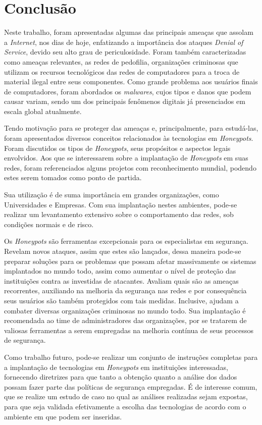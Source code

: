 \chapter*{Conclusão}

Neste trabalho, foram apresentadas algumas das principais ameaças que assolam a \textit{Internet}, nos dias de hoje, enfatizando a importância dos ataques \textit{Denial of Service}, devido seu alto grau de periculosidade. Foram também caracterizadas como ameaças relevantes, as redes de pedofilia, organizações criminosas que utilizam os recursos tecnológicos das redes de computadores para a troca de material ilegal entre seus componentes. Como grande problema aos usuários finais de computadores, foram abordados os \textit{malwares}, cujos tipos e danos que podem causar variam, sendo um dos principais fenômenos digitais já presenciados em escala global atualmente.

Tendo motivação para se proteger das ameaças e, principalmente, para estudá-las, foram apresentados diversos conceitos relacionados às tecnologias em \textit{Honeypots}. Foram discutidos os tipos de \textit{Honeypots}, seus propósitos e aspectos legais envolvidos. Aos que se interessarem sobre a implantação de \textit{Honeypots} em suas redes, foram referenciados alguns projetos com reconhecimento mundial, podendo estes serem tomados como ponto de partida.

Sua utilização é de suma importância em grandes organizações, como Universidades e Empresas. Com sua implantação nestes ambientes, pode-se realizar um levantamento extensivo sobre o comportamento das redes, sob condições normais e de risco.

Os \textit{Honeypots} são ferramentas excepcionais para os especialistas em segurança. Revelam novos ataques, assim que estes são lançados, dessa maneira pode-se preparar soluções para os problemas que possam afetar massivamente os sistemas implantados no mundo todo, assim como aumentar o nível de proteção das instituições contra as investidas de atacantes. Avaliam quais são as ameaças recorrentes, auxiliando na melhoria da segurança nas redes e por consequência seus usuários são também protegidos com tais medidas. Inclusive, ajudam a combater diversas organizações criminosas no mundo todo. Sua implantação é recomendada ao time de administradores das organizações, por se tratarem de valiosas ferramentas a serem empregadas na melhoria contínua de seus processos de segurança.

Como trabalho futuro, pode-se realizar um conjunto de instruções completas para a implantação de tecnologias em \textit{Honeypots} em instituições interessadas, fornecendo diretrizes para que tanto a obtenção quanto a análise dos dados possam fazer parte das políticas de segurança empregadas. É de interesse comum, que se realize um estudo de caso no qual as análises realizadas sejam expostas, para que seja validada efetivamente a escolha das tecnologias de acordo com o ambiente em que podem ser inseridas.

